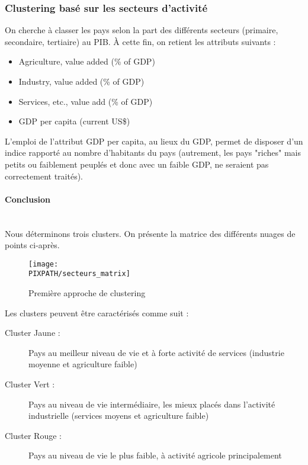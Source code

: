 \subsubsection{Clustering basé sur les secteurs d'activité}

On cherche à classer les pays selon la part des différents secteurs
(primaire, secondaire, tertiaire) au PIB. À cette fin, on retient les
attributs suivants :
\begin{itemize}
\item Agriculture, value added (\% of GDP)
\item Industry, value added (\% of GDP)
\item Services, etc., value add (\% of GDP)
\item GDP per capita (current US\$)
\end{itemize}

\vskip 6pt

L'emploi de l'attribut GDP per capita, au lieux du GDP, permet de disposer
d'un indice rapporté au nombre d'habitants du pays (autrement, les pays
"riches" mais petits ou faiblement peuplés et donc avec un faible GDP, ne
seraient pas correctement traités).

\paragraph{Conclusion}\hfill\\

Nous déterminons trois clusters. On présente la matrice des différents
nuages de points ci-après.

\begin{sidewaysfigure}[h]
\centering
\caption{Première approche de clustering}
\texttt{[image: \\PIXPATH/secteurs\_matrix]}
\end{sidewaysfigure}

Les clusters peuvent être caractérisés comme suit :
\begin{description}
\item[Cluster Jaune : ] Pays au meilleur niveau de vie et à forte activité de services (industrie moyenne et agriculture faible)
\item[Cluster Vert : ] Pays au niveau de vie intermédiaire, les mieux placés dans l'activité industrielle (services moyens et agriculture faible)
\item[Cluster Rouge :] Pays au niveau de vie le plus faible, à activité agricole principalement
\end{description}


